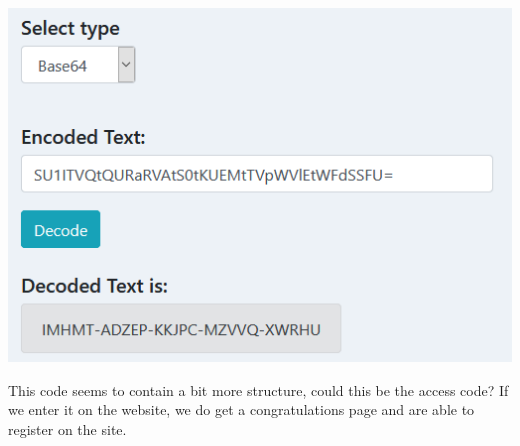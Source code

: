 \documentclass[../main.tex]{subfiles}
\begin{document}
\begin{center}
    \includegraphics[width=0.75\linewidth]{images/hackthebox_decode2.png}
\end{center}

This code seems to contain a bit more structure, could this be the access code? If we enter it on the website, we do get a congratulations page and are able to register on the site.
\end{document}

